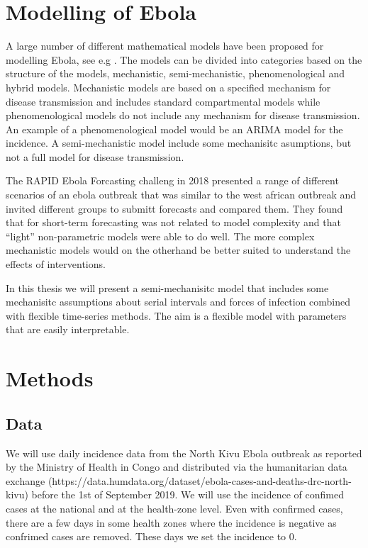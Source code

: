 \documentclass[12pt]{article}
\begin{document}
\section{Modelling of Ebola}

A large number of different mathematical models have been proposed for modelling Ebola, see e.g \cite{chretienMathematicalModelingWest,viboudRAPIDDEbolaForecasting2018}. The models can be divided into categories based on the structure of the models, mechanistic, semi-mechanistic, phenomenological and hybrid models. Mechanistic models are based on a specified mechanism for disease transmission and includes standard compartmental models while phenomenological models do not include any mechanism for disease transmission. An example of a phenomenological model would be an ARIMA model for the incidence. A semi-mechanistic model include some mechanisitc asumptions, but not a full model for disease transmission.

The RAPID Ebola Forcasting challeng in 2018 \cite{viboudRAPIDDEbolaForecasting2018} presented a range of different scenarios of an ebola outbreak that was similar to the west african outbreak and invited different groups to submitt forecasts and compared them. They found that for short-term forecasting was not related to model complexity and that ``light'' non-parametric models were able to do well. The more complex mechanistic models would on the otherhand be better suited to understand the effects of interventions. 

In this thesis we will present a semi-mechanisitc model that includes some mechanisitc assumptions about serial intervals and forces of infection combined with flexible time-series methods. The aim is a flexible model with parameters that are easily interpretable. 

\section{Methods}

\subsection{Data}
We will use daily incidence data from the North Kivu Ebola outbreak as reported by the Ministry of Health in Congo and distributed via the humanitarian data exchange (https://data.humdata.org/dataset/ebola-cases-and-deaths-drc-north-kivu) before the 1st of September 2019. We will use the incidence of confimed cases at the national and at the health-zone level. Even with confirmed cases, there are a few days in some health zones where the incidence is negative as confrimed cases are removed. These days we set the incidence to 0. 
\end{document}
